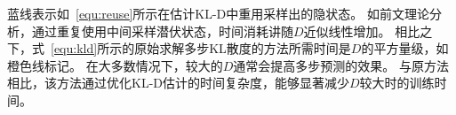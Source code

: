 蓝线表示如~\eqref{equ:reuse}所示在估计KL-D中重用采样出的隐状态。
如前文理论分析，通过重复使用中间采样潜伏状态，时间消耗讲随$D$近似线性增加。
相比之下，式~\eqref{equ:kld}所示的原始求解多步KL散度的方法所需时间是$D$的平方量级，如橙色线标记。
在大多数情况下，较大的$D$通常会提高多步预测的效果。
与原方法相比，该方法通过优化KL-D估计的时间复杂度，能够显著减少$D$较大时的训练时间。


